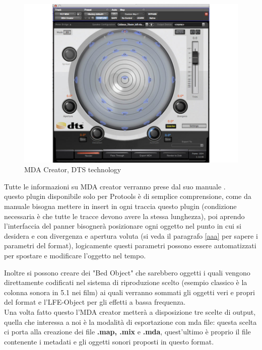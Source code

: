 \documentclass[12pt,a4paper]{report}
\begin{document}
\begin{figure}[htbp]
	\centering
	\includegraphics[scale=0.50]{figures/mdacreator.jpg}
	
	\caption {MDA Creator, DTS technology} 
	\label{fig:mdacreator}
	\end{figure}

Tutte le informazioni su MDA creator verranno prese dal suo manuale \cite{creator}.\\

questo plugin disponibile solo per Protools è di semplice comprensione, come da manuale bisogna mettere in insert in ogni traccia questo plugin (condizione necessaria è che tutte le tracce devono avere la stessa lunghezza), poi aprendo l'interfaccia del panner bisognerà posizionare ogni oggetto nel punto in cui si desidera e con divergenza e apertura voluta (si veda il paragrafo \ref{aaa} per sapere i parametri del format), logicamente questi parametri possono essere automatizzati per spostare e modificare l'oggetto nel tempo.

Inoltre si possono creare dei "Bed Object" che sarebbero oggetti i quali vengono direttamente codificati nel sistema di riproduzione scelto (esempio classico è la colonna sonora in 5.1 nei film) ai quali verranno sommati gli oggetti veri e propri del format e l'LFE-Object per gli effetti a bassa frequenza.\\

Una volta fatto questo l'MDA creator metterà a disposizione tre scelte di output, quella che interessa a noi è la modalità di esportazione con mda file: questa scelta ci porta alla creazione dei file \textbf{.map, .mix} e \textbf{.mda}, quest'ultimo è proprio il file contenente i metadati e gli oggetti sonori proposti in questo format.
\end{document}

